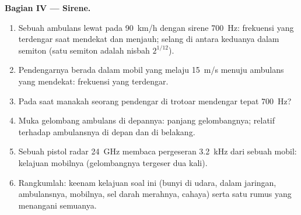 \begin{problem}
\medskip
\noindent\textbf{Bagian IV --- Sirene.}
\begin{enumerate}[resume]
  \item Sebuah ambulans lewat pada \qty{90}{km/h} dengan sirene \qty{700}{Hz}:
        frekuensi yang terdengar saat mendekat dan menjauh; selang
        di antara keduanya dalam semiton (satu semiton adalah nisbah $2^{1/12}$).
  \item Pendengarnya berada dalam mobil yang melaju \qty{15}{m/s} menuju
        ambulans yang mendekat: frekuensi yang terdengar.
  \item Pada saat manakah seorang pendengar di trotoar mendengar tepat
        \qty{700}{Hz}?
  \item Muka gelombang ambulans di depannya: panjang gelombangnya;  relatif terhadap ambulansnya di depan dan di belakang.
  \item Sebuah pistol radar \qty{24}{GHz} membaca pergeseran \qty{3.2}{kHz} dari sebuah mobil:
        kelajuan mobilnya (gelombangnya tergeser dua kali).
  \item Rangkumlah: keenam kelajuan soal ini (bunyi di udara, dalam
        jaringan, ambulansnya, mobilnya, sel darah merahnya, cahaya) serta
        satu rumus yang menangani semuanya.
\end{enumerate}
\end{problem}
